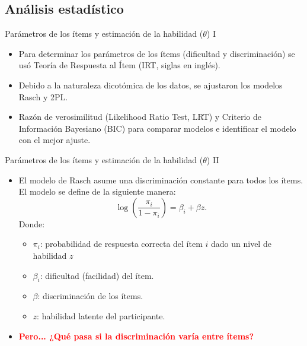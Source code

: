 \documentclass[aspectratio=169]{beamer}
\begin{document}
\subsection{Análisis estadístico}

\begin{frame}{Parámetros de los ítems y estimación de la habilidad ($\theta$) I}
	\begin{itemize}
		\item Para determinar los parámetros de los ítems (dificultad y discriminación) se usó Teoría de Respuesta al Ítem (IRT, siglas en inglés).
		\vspace{10pt}
		\item Debido a la naturaleza dicotómica de los datos, se ajustaron los modelos Rasch y 2PL.
		\vspace{10pt}
		\item Razón de verosimilitud (Likelihood Ratio Test, LRT) y Criterio de Información Bayesiano (BIC) para comparar modelos e identificar el modelo con el mejor ajuste.
	\end{itemize}
\end{frame}

\begin{frame}{Parámetros de los ítems y estimación de la habilidad ($\theta$) II}
	\begin{itemize}
		\item El modelo de Rasch asume una discriminación constante para todos los ítems. El modelo se define de la siguiente manera:
		\[ \log\left(\frac{\pi_i}{1-\pi_i}\right)=\beta_i+\beta z .\]
		Donde:
		\begin{itemize} 
			\item $\pi_i$: probabilidad de respuesta correcta del ítem $i$ dado un nivel de habilidad $z$
			\item $\beta_i$: dificultad (facilidad) del ítem. 
			\item $\beta$: discriminación de los ítems. 
			\item $z$: habilidad latente del participante. 
		\end{itemize}
		\vspace{10pt}
		\item \textcolor{red}{\bf Pero... ¿Qué pasa si la discriminación varía entre ítems?}
	\end{itemize}
\end{frame}
\end{document}

